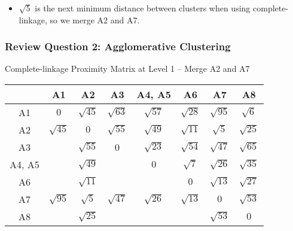 \documentclass[aspectratio=169, 10pt]{beamer}
\begin{document}
\begin{frame}[t]
    \begin{itemize}
        \item $\sqrt{5}$ is the next minimum distance between clusters when using complete-linkage, so we merge A2 and A7.
    \end{itemize}

\end{frame}

\begin{frame}[t]
    \frametitle{Review Question 2: Agglomerative Clustering}
    \small

    Complete-linkage Proximity Matrix at Level 1 -- Merge A2 and A7

    \begin{table}[]
        \scriptsize
        \begin{tabular}{c|ccccccc}
                & A1          & A2                                 & A3          & A4, A5      & A6          & \cellcolor[HTML]{9B9B9B}A7                                 & A8          \\ \hline
        A1      & $0$         & {\color[HTML]{9b9b9b} $\sqrt{45}$} & $\sqrt{63}$ & $\sqrt{57}$ & $\sqrt{28}$ & {\color[HTML]{3531FF} $\sqrt{95}$} & $\sqrt{6}$  \\
        A2      & {\color[HTML]{9b9b9b} $\sqrt{45}$} & {\color[HTML]{3531FF} $0        $} & {\color[HTML]{3531FF} $\sqrt{55}$} & {\color[HTML]{3531FF} $\sqrt{49}$} & {\color[HTML]{9b9b9b} $\sqrt{11}$} & {\color[HTML]{9b9b9b} $\sqrt{5}$ } & {\color[HTML]{9b9b9b} $\sqrt{25}$} \\
        A3      &             & {\color[HTML]{3531FF} $\sqrt{55}$} & 0           & $\sqrt{23}$ & $\sqrt{54}$ & {\color[HTML]{9b9b9b} $\sqrt{47}$} & $\sqrt{65}$ \\
        A4, A5  &             & {\color[HTML]{3531FF} $\sqrt{49}$} &             & $0        $ & $\sqrt{7 }$ & {\color[HTML]{9b9b9b} $\sqrt{26}$} & $\sqrt{35}$ \\
        A6      &             & {\color[HTML]{9b9b9b} $\sqrt{11}$} &             &             & $0        $ & {\color[HTML]{3531FF} $\sqrt{13}$} & $\sqrt{27}$ \\
        \cellcolor[HTML]{9B9B9B}A7      & {\color[HTML]{3531FF} $\sqrt{95}$} & {\color[HTML]{9b9b9b} $\sqrt{5 }$} & {\color[HTML]{9b9b9b} $\sqrt{47}$} & {\color[HTML]{9b9b9b} $\sqrt{26}$} & {\color[HTML]{3531FF} $\sqrt{13}$} & {\color[HTML]{3531FF} $0        $} & {\color[HTML]{3531FF} $\sqrt{53}$} \\
        A8      &             & {\color[HTML]{9b9b9b} $\sqrt{25}$} &             &             &             & {\color[HTML]{3531FF} $\sqrt{53}$} & $0        $
        \end{tabular}
    \end{table}


\end{frame}
\end{document}
